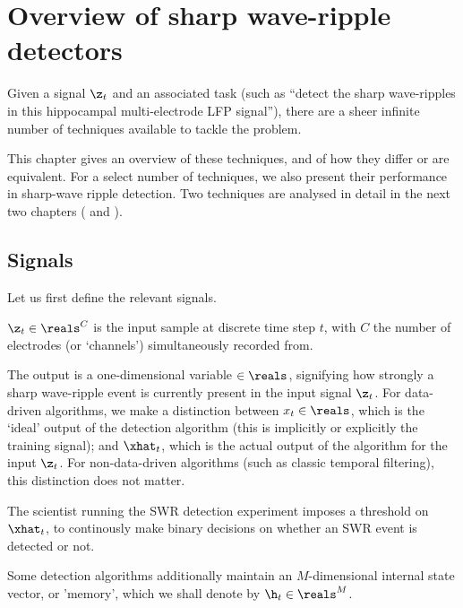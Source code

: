 
\chapter{Overview of sharp wave-ripple detectors}


Given a signal $\z_t$ and an associated task (such as ``detect the sharp
wave-ripples in this hippocampal multi-electrode LFP signal''), there are a
sheer infinite number of techniques available to tackle the problem.

This chapter gives an overview of these techniques, and of how they differ or
are equivalent. For a select number of techniques, we also present their
performance in sharp-wave ripple detection. Two techniques are analysed in
detail in the next two chapters ( and ).





\section{Signals}

Let us first define the relevant signals.

$\z_t \in \reals^C$ is the input sample at discrete time step
$t$,\footnotemark{} with $C$ the number of electrodes (or `channels')
simultaneously recorded from.

The output is a one-dimensional variable $\in \reals$, signifying how
strongly a sharp wave-ripple event is currently present in the input signal
$\z_t$. For data-driven algorithms, we make a distinction between $x_t \in
\reals$, which is the `ideal' output of the detection algorithm (this is
implicitly or explicitly the training signal); and $\xhat_t$, which is the
actual output of the algorithm for the input $\z_t$. For non-data-driven
algorithms (such as classic temporal filtering), this distinction does not
matter.

The scientist running the SWR detection experiment imposes a threshold on
$\xhat_t$, to continously make binary decisions on whether an SWR event is
detected or not.

Some detection algorithms additionally maintain an $M$-dimensional internal
state vector, or 'memory', which we shall denote by $\h_t \in \reals^M$.

